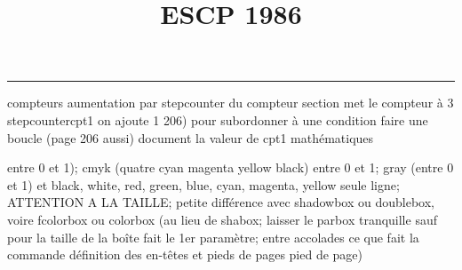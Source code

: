 \documentclass[11pt]{article}%
\title{\bf \vspace{-2cm} ESCP 1986} %
\author{} %
\date{} %
\renewcommand{\headrulewidth}{0pt}%
\renewcommand{\footrulewidth}{0.4pt}%
\begin{document}
\maketitle %
\vspace{-1.4cm}\hrule %
\thispagestyle{fancy}

\vspace*{.2cm}



compteurs%
aumentation par stepcounter du compteur section%
met le compteur à 3%
stepcounter{cpt1} on ajoute 1%
206) pour subordonner à une condition %
faire une boucle (page 206 aussi) %
document la valeur de cpt1 
mathématiques\newcommand{\ch}{\operatorname{ch}} 
\newcommand{\sh}{\operatorname{sh}}
\renewcommand{\tanh}{\operatorname{th}}
\renewcommand{\sinh}{\operatorname{sh}}
\renewcommand{\cosh}{\operatorname{ch}}
\newcommand{\argsh}{\operatorname{argsh}}
\newcommand{\argch}{\operatorname{argch}}
\newcommand{\argth}{\operatorname{argth}}
\newcommand{\ker}{\operatorname{Ker}}
\renewcommand{\im}{\operatorname{Im}}
\newcommand{\rg}{\operatorname{rg}}
\newcommand{\Id}{\operatorname{Id}}
\newcommand{\id}{\operatorname{id}}
\renewcommand{\leq}{\leq}
\renewcommand{\geq}{\geq }

entre 0 et 1); cmyk (quatre cyan magenta yellow black) entre 0 et 1;
gray (entre 0 et 1) et black, white, red, green, blue, cyan, magenta,
yellow%
seule ligne; ATTENTION A LA TAILLE; petite différence avec shadowbox ou
doublebox, voire fcolorbox ou colorbox (au lieu de shabox; laisser le
parbox tranquille sauf pour la taille de la boîte
\newcommand{\Tbox}[1]{\begin{center} \shabox{\parbox{0.6
\linewidth}{#1}} \end{center}} %
fait le 1er paramètre; entre accolades ce que fait la commande
définition des en-têtes et pieds de pages\pagestyle{fancy}
\chead{}
\rfoot[ \ \thepage]{\thepage}
\cfoot{}
\lfoot{}
\thispagestyle{fancy} %
pied de page)\renewcommand{\footrulewidth}{0.4pt}
\renewcommand{\headrulewidth}{0.4pt}
\end{document}
